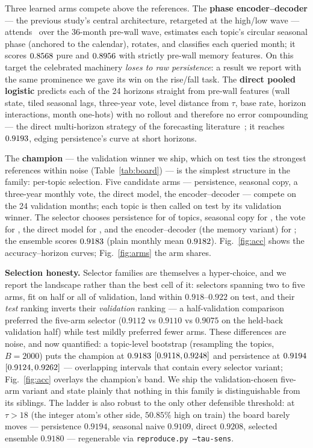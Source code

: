 \documentclass[11pt]{artaquest}
\begin{document}
Three learned arms compete above the references. The \textbf{phase encoder--decoder} --- the
previous study's central architecture, retargeted at the high/low wave --- attends~\cite{vaswani2017attention} over the
36-month pre-wall wave, estimates each topic's circular seasonal phase (anchored to the
calendar), rotates, and classifies each queried month; it scores $0.8568$ pure and
$0.8956$ with strictly pre-wall memory features. On this target the celebrated machinery
\emph{loses to raw persistence}: a result we report with the same prominence we gave its win on
the rise/fall task. The \textbf{direct pooled logistic} predicts each of the 24 horizons
straight from pre-wall features (wall state, tiled seasonal lags, three-year vote, level
distance from $\tau$, base rate, horizon interactions, month one-hots) with no rollout and
therefore no error compounding --- the direct multi-horizon strategy of the forecasting literature~\cite{makridakis2020m4,gardner1985damped}; it reaches $0.9193$, edging persistence's curve at short
horizons.

The \textbf{champion} --- the validation winner we ship, which on test ties the strongest
references within noise (Table~\ref{tab:board}) --- is the simplest structure in the family:
per-topic selection.
Five candidate arms --- persistence, seasonal copy, a three-year monthly vote, the direct
model, the encoder--decoder --- compete on the 24 validation months; each topic is then called
on test by its validation winner. The selector chooses persistence for \armPersist{} of
\nTopics{} topics, seasonal copy for \armSnaive{}, the vote for \armVote{}, the direct model
for \armDirect{}, and the encoder--decoder (the memory variant) for \armEnc{}; the ensemble scores $0.9183$
(plain monthly mean $0.9182$). Fig.~\ref{fig:acc} shows the accuracy--horizon curves;
Fig.~\ref{fig:arms} the arm shares.

\textbf{Selection honesty.} Selector families are themselves a hyper-choice, and we report the
landscape rather than the best cell of it: selectors spanning two to five arms, fit on half or
all of validation, land within $0.918$--$0.922$ on test, and their \emph{test} ranking inverts
their \emph{validation} ranking --- a half-validation comparison preferred the five-arm
selector ($0.9112$ vs $0.9110$ vs $0.9075$ on the held-back validation half) while test mildly
preferred fewer arms. These differences are noise, and now quantified: a topic-level bootstrap
(resampling the \nTopics{} topics, $B=2000$) puts the champion at $0.9183$
$[0.9118, 0.9248]$ and persistence at $0.9194$ $[0.9124, 0.9262]$ ---
overlapping intervals that contain every selector variant; Fig.~\ref{fig:acc} overlays the
champion's band. We ship the validation-chosen five-arm variant and state plainly that nothing
in this family is distinguishable from its siblings. The ladder is also robust to the only
other defensible threshold: at $\tau>18$ (the integer atom's other side, $50.85\%$ high on
train) the board barely moves --- persistence $0.9194$, seasonal naive $0.9109$, direct
$0.9208$, selected ensemble $0.9180$ --- regenerable via \texttt{reproduce.py --tau-sens}.
\end{document}
